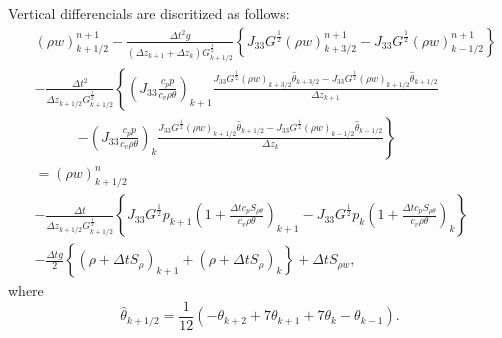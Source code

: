 Vertical differencials are discritized as follows:
\begin{align}
&
  (\rho w)_{k+1/2}^{n+1}
  -\frac{\Delta t^2 g}{(\Delta z_{k+1} + \Delta z_k) G^{\frac{1}{2}}_{k+1/2}}
  \left\{J_{33}G^{\frac{1}{2}}(\rho w)^{n+1}_{k+3/2}
        -J_{33}G^{\frac{1}{2}}(\rho w)^{n+1}_{k-1/2}\right\}
    \nonumber\\ &
  - \frac{\Delta t^2}{\Delta z_{k+1/2} G^{\frac{1}{2}}_{k+1/2}}
  \left\{
    \left(J_{33}\frac{c_pp}{c_v\rho\theta}\right)_{k+1}\frac{
    J_{33}G^{\frac{1}{2}}(\rho w)_{k+3/2}\hat{\theta}_{k+3/2}-J_{33}G^{\frac{1}{2}}(\rho w)_{k+1/2}\hat{\theta}_{k+1/2}}{\Delta z_{k+1}} \right.\nonumber\\&\:\:\:\:\:\:\:\:\:\:\:\:\:\:\left.
    -\left(J_{33}\frac{c_pp}{c_v\rho\theta}\right)_k\frac{
    J_{33}G^{\frac{1}{2}}(\rho w)_{k+1/2}\hat{\theta}_{k+1/2}-J_{33}G^{\frac{1}{2}}(\rho w)_{k-1/2}\hat{\theta}_{k-1/2}}{\Delta z_k}\right\} \nonumber\\
  &=
  (\rho w)_{k+1/2}^n \nonumber\\&
  -\frac{\Delta t}{\Delta z_{k+1/2} G^{\frac{1}{2}}_{k+1/2}} \left\{
    J_{33}G^{\frac{1}{2}} p_{k+1}\left(1+\frac{\Delta tc_pS_{\rho\theta}}{c_v\rho\theta}\right)_{k+1}
  - J_{33}G^{\frac{1}{2}} p_k   \left(1+\frac{\Delta tc_pS_{\rho\theta}}{c_v\rho\theta}\right)_k \right\}\nonumber\\ &
  -\frac{\Delta t g}{2} \left\{ (\rho+\Delta t S_\rho)_{k+1}+(\rho+\Delta t S_\rho)_k\right\} + \Delta t S_{\rho w},
\end{align}
where
\begin{equation}
  \hat{\theta}_{k+1/2} = \frac{1}{12}\left(-\theta_{k+2}+7\theta_{k+1}+7\theta_k-\theta_{k-1}\right).
\end{equation}

